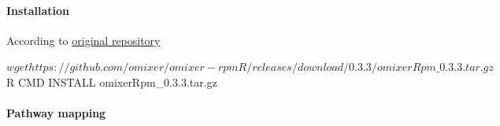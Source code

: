 \documentclass[
]{article}
\newenvironment{Shaded}{\begin{snugshade}}{\end{snugshade}}
\newcommand{\ExtensionTok}[1]{#1}
\newcommand{\NormalTok}[1]{#1}
\begin{document}
\hypertarget{installation}{%
\paragraph{Installation}\label{installation}}

According to
\href{https://github.com/omixer/omixer-rpmR?tab=readme-ov-file}{original
repository}

\begin{Shaded}
\begin{Highlighting}[]
\ExtensionTok{$}\NormalTok{ wget https://github.com/omixer/omixer{-}rpmR/releases/download/0.3.3/omixerRpm\_0.3.3.tar.gz}
\ExtensionTok{$}\NormalTok{ R CMD INSTALL omixerRpm\_0.3.3.tar.gz}
\end{Highlighting}
\end{Shaded}

\hypertarget{pathway-mapping}{%
\paragraph{Pathway mapping}\label{pathway-mapping}}
\end{document}
